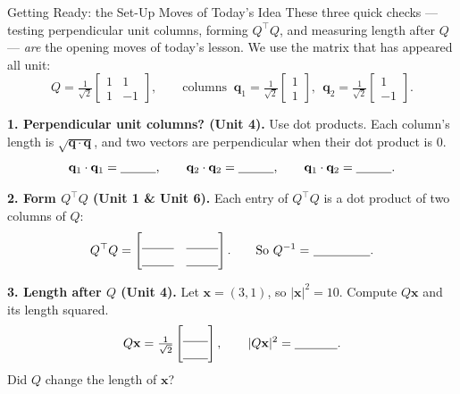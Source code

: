 \documentclass[10pt]{article}
\newcommand{\xx}{\mathbf{x}}
\newcommand{\qq}{\mathbf{q}}
\newcommand{\T}{^{\top}}
\begin{document}
\namedateperiod

\vspace{0.12in}

\begin{notesbox}{Getting Ready: the Set-Up Moves of Today's Idea}
\small These three quick checks --- testing perpendicular unit columns, forming $Q\T Q$, and measuring length
after $Q$ --- \emph{are} the opening moves of today's lesson. We use the matrix that has appeared all unit:
\[
  Q=\tfrac1{\sqrt2}\begin{bmatrix} 1 & 1\\ 1 & -1 \end{bmatrix},\qquad
  \text{columns }\ \qq_1=\tfrac1{\sqrt2}\begin{bmatrix} 1\\1 \end{bmatrix},\ \ \qq_2=\tfrac1{\sqrt2}\begin{bmatrix} 1\\-1 \end{bmatrix}.
\]

\vspace{2pt}
\textbf{1. Perpendicular unit columns? (Unit 4).} Use dot products. Each column's length is
$\sqrt{\qq\cdot\qq}$, and two vectors are perpendicular when their dot product is $0$.
\[
  \qq_1\cdot\qq_1=\blank{1.0cm},\qquad \qq_2\cdot\qq_2=\blank{1.0cm},\qquad \qq_1\cdot\qq_2=\blank{1.0cm}.
\]

\textbf{2. Form $Q\T Q$ (Unit 1 \& Unit 6).} Each entry of $Q\T Q$ is a dot product of two columns of $Q$:
\[
  Q\T Q=\begin{bmatrix}\rule{0pt}{1.1em}\blank{0.9cm} & \blank{0.9cm}\\[2pt]\blank{0.9cm} & \blank{0.9cm}\end{bmatrix}.
  \qquad\text{So $Q^{-1}=$ }\blank{1.6cm}.
\]

\textbf{3. Length after $Q$ (Unit 4).} Let $\xx=(3,1)$, so $|\xx|^2=10$. Compute $Q\xx$ and its length squared.
\[
  Q\xx=\tfrac1{\sqrt2}\begin{bmatrix}\rule{0pt}{1.1em}\blank{0.7cm}\\[2pt]\blank{0.7cm}\end{bmatrix},\qquad
  |Q\xx|^2=\blank{1.2cm}.
\]
Did $Q$ change the length of $\xx$?\ \ \blank{2.4cm}
\end{notesbox}
\end{document}
